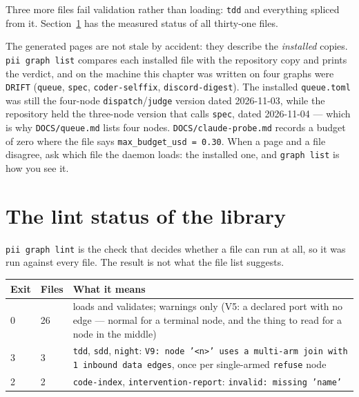 Three more files fail validation rather than loading: \texttt{tdd} and everything spliced from
it. Section~\ref{sec:lint-status} has the measured status of all thirty-one files.

The generated pages are not stale by accident: they describe the \emph{installed} copies.
\texttt{pii graph list} compares each installed file with the repository copy and prints the
verdict, and on the machine this chapter was written on four graphs were \texttt{DRIFT}
(\texttt{queue}, \texttt{spec}, \texttt{coder-selffix}, \texttt{discord-digest}). The installed
\texttt{queue.toml} was still the four-node \texttt{dispatch}/\texttt{judge} version dated
2026-11-03, while the repository held the three-node version that calls \texttt{spec}, dated
2026-11-04 --- which is why \texttt{DOCS/queue.md} lists four nodes.
\texttt{DOCS/claude-probe.md} records a budget of zero where the file says
\texttt{max\_budget\_usd = 0.30}. When a page and a file disagree, ask which file the daemon
loads: the installed one, and \texttt{graph list} is how you see it.

\section{The lint status of the library}

\label{sec:lint-status}

\texttt{pii graph lint} is the check that decides whether a file can run at all, so it was run
against every file. The result is not what the file list suggests.

\begin{center}\footnotesize
\begin{tabular}{@{}p{}p{}p{}@{}}
  \toprule
  \textbf{Exit} & \textbf{Files} & \textbf{What it means} \\
  \midrule
  0 & 26 & loads and validates; warnings only (V5: a declared port with no edge ---
    normal for a terminal node, and the thing to read for a node in the middle) \\
  3 & 3 & \texttt{tdd}, \texttt{sdd}, \texttt{night}: \texttt{V9: node '<n>' uses a
    multi-arm join with 1 inbound data edges}, once per single-armed \texttt{refuse} node \\
  2 & 2 & \texttt{code-index}, \texttt{intervention-report}: \texttt{invalid: missing 'name'} \\
  \bottomrule
\end{tabular}
\end{center}

